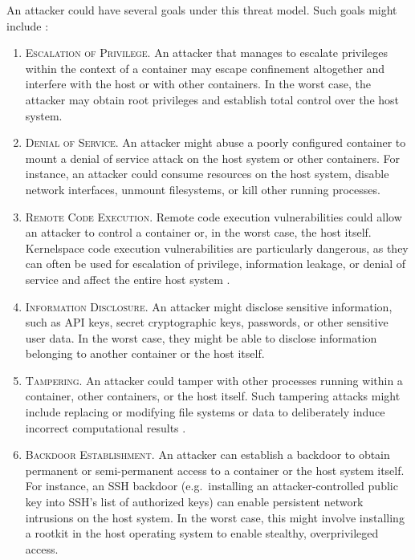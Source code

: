 An attacker could have several goals under this threat model. Such goals might include \cite{sultan2019_container_security,xin2018_container_security}:
\begin{enumerate}[label=\bfseries AG\arabic*., ref=AG\arabic*, labelindent=1em]
  \item \textsc{Escalation of Privilege.}
    An attacker that manages to escalate privileges within the context of a container may escape confinement altogether and interfere with the host or with other containers. In the worst case, the attacker may obtain root privileges and establish total control over the host system.

  \item \textsc{Denial of Service.}
    An attacker might abuse a poorly configured container to mount a denial of service attack on the host system or other containers. For instance, an attacker could consume resources on the host system, disable network interfaces, unmount filesystems, or kill other running processes.

  \item \textsc{Remote Code Execution.}
    Remote code execution vulnerabilities could allow an attacker to control a container or, in the worst case, the host itself. Kernelspace code execution vulnerabilities are particularly dangerous, as they can often be used for escalation of privilege, information leakage, or denial of service and affect the entire host system \cite{sultan2019_container_security, xin2018_container_security}.

  \item \textsc{Information Disclosure.}
    An attacker might disclose sensitive information, such as API keys, secret cryptographic keys, passwords, or other sensitive user data. In the worst case, they might be able to disclose information belonging to another container or the host itself.

  \item \textsc{Tampering.}
    An attacker could tamper with other processes running within a container, other containers, or the host itself. Such tampering attacks might include replacing or modifying file systems or data to deliberately induce incorrect computational results \cite{sultan2019_container_security}.

  \item \textsc{Backdoor Establishment.}
    An attacker can establish a backdoor to obtain permanent or semi-permanent access to a container or the host system itself. For instance, an SSH backdoor (e.g.~installing an attacker-controlled public key into SSH's list of authorized keys) can enable persistent network intrusions on the host system. In the worst case, this might involve installing a rootkit \cite{beegle2007_rootkit} in the host operating system to enable stealthy, overprivileged access.
\end{enumerate}

